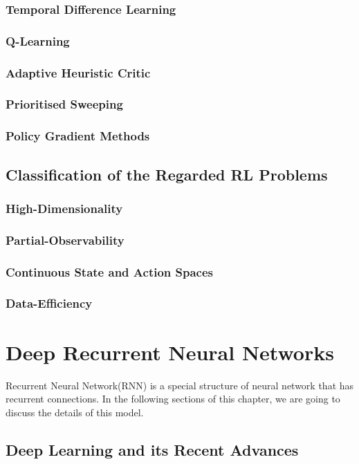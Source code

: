 \documentclass[officiallayout]{tktla}
\begin{document}
\subsection{Temporal Difference Learning}
\subsection{Q-Learning}
\subsection{Adaptive Heuristic Critic}
\subsection{Prioritised Sweeping}
\subsection{Policy Gradient Methods}

\section{Classification of the Regarded RL Problems}
\subsection{High-Dimensionality}
\subsection{Partial-Observability}
\subsection{Continuous State and Action Spaces}
\subsection{Data-Efficiency}

\chapter{Deep Recurrent Neural Networks}
Recurrent Neural Network(RNN) is a special structure of neural network that has recurrent connections. In the following sections of this chapter, we are going to discuss the details of this model.
\section{Deep Learning and its Recent Advances}
\end{document}
